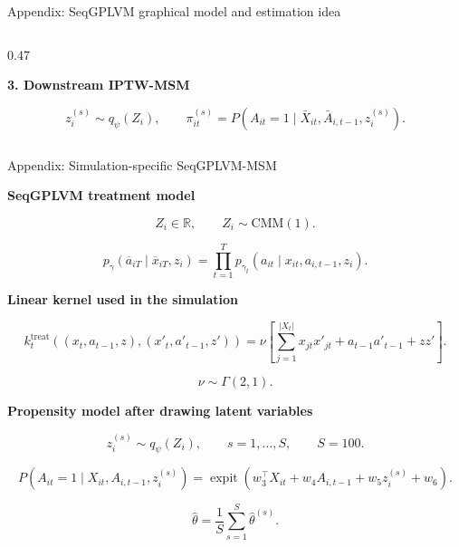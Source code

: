 \documentclass[aspectratio=169,12pt]{beamer}
\newcommand{\muted}[1]{\textcolor{PrimerMuted}{#1}}
\newcommand{\pstrong}[1]{{\bfseries #1}}
\newcommand{\smallref}[1]{\vspace{0.15cm}{\fontsize{5.8}{7}\selectfont\muted{#1}}}
\begin{document}
\begin{frame}{Appendix: SeqGPLVM graphical model and estimation idea}
\begin{columns}[T,onlytextwidth]
\begin{column}{0.47\textwidth}
{\vspace{0.05cm}
\pstrong{3. Downstream IPTW-MSM}

\vspace{-0.45cm}
\[
z_i^{(s)}\sim q_\psi(Z_i),\qquad
\pi_{it}^{(s)}
=
P(A_{it}=1\mid \bar X_{it},\bar A_{i,t-1},z_i^{(s)}).
\]

\vspace{-0.45cm}

\vspace{-0.25cm}
}

\end{column}

\end{columns}


\end{frame}

\begin{frame}{Appendix: Simulation-specific SeqGPLVM-MSM}
\vspace{-0.2cm}
{\fontsize{7.2}{8.6}\selectfont

\textbf{SeqGPLVM treatment model}

\[
Z_i\in\mathbb{R},
\qquad
Z_i\sim \mathrm{CMM}(1).
\]

\[
p_\gamma(\overline a_{iT}\mid \overline x_{iT},z_i)
=
\prod_{t=1}^{T}
p_{\gamma_t}
\left(
a_{it}\mid x_{it},a_{i,t-1},z_i
\right).
\]

\textbf{Linear kernel used in the simulation}

\[
k^{\text{treat}}_t
\left(
(x_t,a_{t-1},z),(x'_t,a'_{t-1},z')
\right)
=
\nu
\left[
\sum_{j=1}^{|X_t|}x_{jt}x'_{jt}
+
a_{t-1}a'_{t-1}
+
zz'
\right].
\]

\[
\nu\sim \Gamma(2,1).
\]

\vspace{0.15cm}

\textbf{Propensity model after drawing latent variables}

\[
z_i^{(s)}\sim q_\psi(Z_i),
\qquad s=1,\ldots,S,
\qquad S=100.
\]

\[
P(A_{it}=1\mid X_{it},A_{i,t-1},z_i^{(s)})
=
\operatorname{expit}
\left(
w_3^\top X_{it}
+
w_4 A_{i,t-1}
+
w_5 z_i^{(s)}
+
w_6
\right).
\]

\[
\hat\theta
=
\frac{1}{S}
\sum_{s=1}^{S}\hat\theta^{(s)}.
\]

}
\end{frame}
\end{document}
